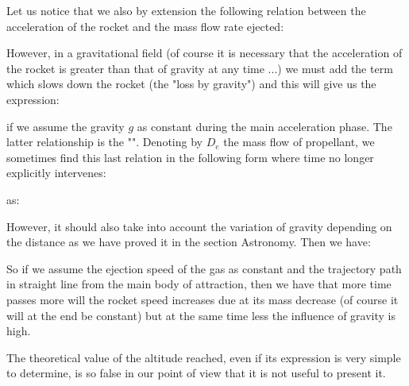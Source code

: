 	Let us notice that we also by extension the following relation between the acceleration of the rocket and the mass flow rate ejected:
	
	However, in a gravitational field (of course it is necessary that the acceleration of the rocket is greater than that of gravity at any time ...) we must add the term which slows down the rocket (the "loss by gravity") and this will give us the expression:
	
	if we assume the gravity $g$ as constant during the main acceleration phase. The latter relationship is the "". Denoting by $D_e$ the mass flow of propellant, we sometimes find this last relation in the following form where time no longer explicitly intervenes:
	
	as:
	
	However, it should also take into account the variation of gravity depending on the distance as we have proved it in the section Astronomy. Then we have:
	
	So if we assume the ejection speed of the gas as constant and the trajectory path in straight line from the main body of attraction, then we have that more time passes more will the rocket speed increases due at its mass decrease (of course it will at the end be constant) but at the same time less the influence of gravity is high.
	
	The theoretical value of the altitude reached, even if its expression is very simple to determine, is so false in our point of view that it is not useful to present it.
	
